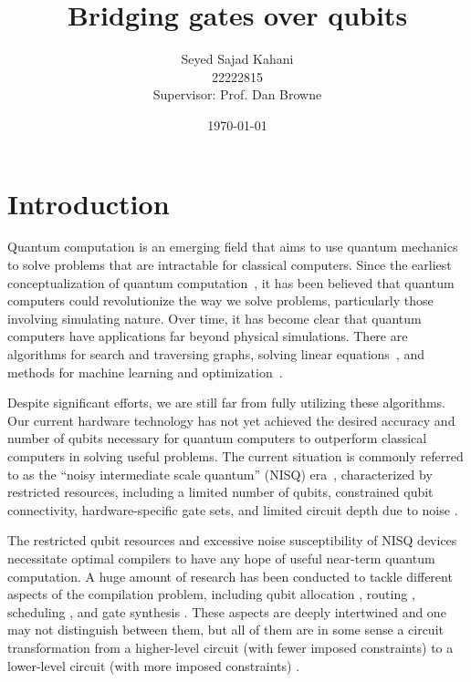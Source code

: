\documentclass{report}
\title{Bridging gates over qubits}
\author{Seyed Sajad Kahani \\ 22222815 \\Supervisor: Prof. Dan Browne}
\date{\today}
\begin{document}
\maketitle

\tableofcontents

\begin{abstract}
  
\end{abstract}

\chapter{Introduction}

Quantum computation is an emerging field that aims to use quantum mechanics to solve problems that are intractable for classical computers. Since the earliest conceptualization of quantum computation~\cite{feynman1986}, it has been believed that quantum computers could revolutionize the way we solve problems, particularly those involving simulating nature. Over time, it has become clear that quantum computers have applications far beyond physical simulations. There are algorithms for search and traversing graphs, solving linear equations~\cite{montanaro2016}, and methods for machine learning and optimization~\cite{jordan2023}.

Despite significant efforts, we are still far from fully utilizing these algorithms. Our current hardware technology has not yet achieved the desired accuracy and number of qubits necessary for quantum computers to outperform classical computers in solving useful problems. The current situation is commonly referred to as the ``noisy intermediate scale quantum'' (NISQ) era~\cite{preskill2018}, characterized by restricted resources, including a limited number of qubits, constrained qubit connectivity, hardware-specific gate sets, and limited circuit depth due to noise \cite{TODO}.

The restricted qubit resources and excessive noise susceptibility of NISQ devices necessitate optimal compilers to have any hope of useful near-term quantum computation. A huge amount of research has been conducted to tackle different aspects of the compilation problem, including qubit allocation \cite{TODO}, routing \cite{TODO}, scheduling \cite{TODO}, and gate synthesis \cite{TODO}. These aspects are deeply intertwined and one may not distinguish between them, but all of them are in some sense a circuit transformation from a higher-level circuit (with fewer imposed constraints) to a lower-level circuit (with more imposed constraints) \cite{TODO}.
\end{document}
